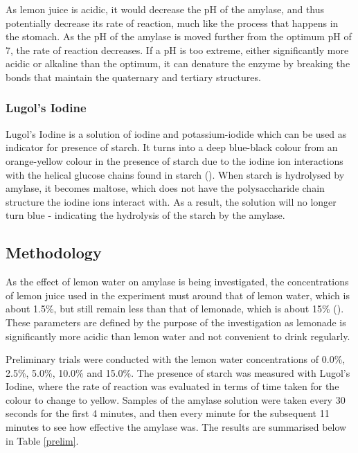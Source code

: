 \documentclass[12pt]{article}
\begin{document}
As lemon juice is acidic, it would decrease the pH of the amylase, and thus potentially decrease its rate of reaction, much like the process that happens in the stomach. As the pH of the amylase is moved further from the optimum pH of 7, the rate of reaction decreases. If a pH is too extreme, either significantly more acidic or alkaline than the optimum, it can denature the enzyme by breaking the bonds that maintain the quaternary and tertiary structures.


\subsubsection{Lugol's Iodine}
Lugol's Iodine is a solution of iodine and potassium-iodide which can be used as indicator for presence of starch. It turns into a deep blue-black colour from an orange-yellow colour in the presence of starch due to the iodine ion interactions with the helical glucose chains found in starch (\citeauthor{sapkota_2022}). When starch is hydrolysed by amylase, it becomes maltose, which does not have the polysaccharide chain structure the iodine ions interact with. As a result, the solution will no longer turn blue - indicating the hydrolysis of the starch by the amylase. 

\subsection{Methodology}

As the effect of lemon water on amylase is being investigated, the concentrations of lemon juice used in the experiment must around that of lemon water, which is about 1.5\%, but still remain less than that of lemonade, which is about 15\% (\citeauthor{overhiser_2021}). These parameters are defined by the purpose of the investigation as lemonade is significantly more acidic than lemon water and not convenient to drink regularly. 

Preliminary trials were conducted with the lemon water concentrations of 0.0\%, 2.5\%, 5.0\%, 10.0\% and 15.0\%. The presence of starch was measured with Lugol's Iodine, where the rate of reaction was evaluated in terms of time taken for the colour to change to yellow. Samples of the amylase solution were taken every 30 seconds for the first 4 minutes, and then every minute for the subsequent 11 minutes to see how effective the amylase was. The results are summarised below in Table \ref{prelim}.
\end{document}
